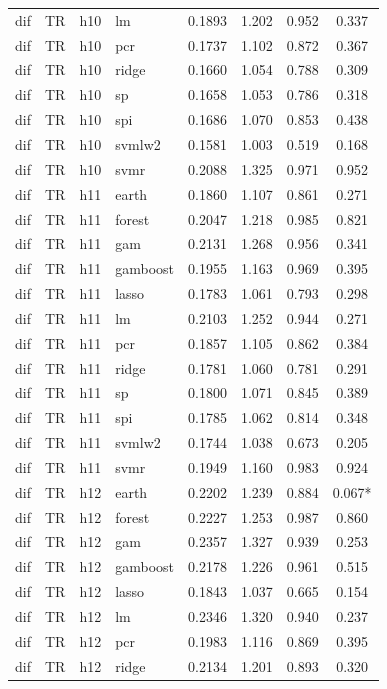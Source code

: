 \begin{ThreePartTable}
\begin{longtable}[t]{llclcccc}
dif & TR & h10 & lm & 0.1893 & 1.202 & 0.952 & 0.337\\
dif & TR & h10 & pcr & 0.1737 & 1.102 & 0.872 & 0.367\\
dif & TR & h10 & ridge & 0.1660 & 1.054 & 0.788 & 0.309\\
dif & TR & h10 & sp & 0.1658 & 1.053 & 0.786 & 0.318\\
dif & TR & h10 & spi & 0.1686 & 1.070 & 0.853 & 0.438\\
dif & TR & h10 & svmlw2 & 0.1581 & 1.003 & 0.519 & 0.168\\
dif & TR & h10 & svmr & 0.2088 & 1.325 & 0.971 & 0.952\\
\addlinespace
dif & TR & h11 & earth & 0.1860 & 1.107 & 0.861 & 0.271\\
dif & TR & h11 & forest & 0.2047 & 1.218 & 0.985 & 0.821\\
dif & TR & h11 & gam & 0.2131 & 1.268 & 0.956 & 0.341\\
dif & TR & h11 & gamboost & 0.1955 & 1.163 & 0.969 & 0.395\\
dif & TR & h11 & lasso & 0.1783 & 1.061 & 0.793 & 0.298\\
dif & TR & h11 & lm & 0.2103 & 1.252 & 0.944 & 0.271\\
dif & TR & h11 & pcr & 0.1857 & 1.105 & 0.862 & 0.384\\
dif & TR & h11 & ridge & 0.1781 & 1.060 & 0.781 & 0.291\\
dif & TR & h11 & sp & 0.1800 & 1.071 & 0.845 & 0.389\\
dif & TR & h11 & spi & 0.1785 & 1.062 & 0.814 & 0.348\\
dif & TR & h11 & svmlw2 & 0.1744 & 1.038 & 0.673 & 0.205\\
dif & TR & h11 & svmr & 0.1949 & 1.160 & 0.983 & 0.924\\
\addlinespace
dif & TR & h12 & earth & 0.2202 & 1.239 & 0.884 & 0.067*\\
dif & TR & h12 & forest & 0.2227 & 1.253 & 0.987 & 0.860\\
dif & TR & h12 & gam & 0.2357 & 1.327 & 0.939 & 0.253\\
dif & TR & h12 & gamboost & 0.2178 & 1.226 & 0.961 & 0.515\\
dif & TR & h12 & lasso & 0.1843 & 1.037 & 0.665 & 0.154\\
dif & TR & h12 & lm & 0.2346 & 1.320 & 0.940 & 0.237\\
dif & TR & h12 & pcr & 0.1983 & 1.116 & 0.869 & 0.395\\
dif & TR & h12 & ridge & 0.2134 & 1.201 & 0.893 & 0.320\\

\end{longtable}
\end{ThreePartTable}
